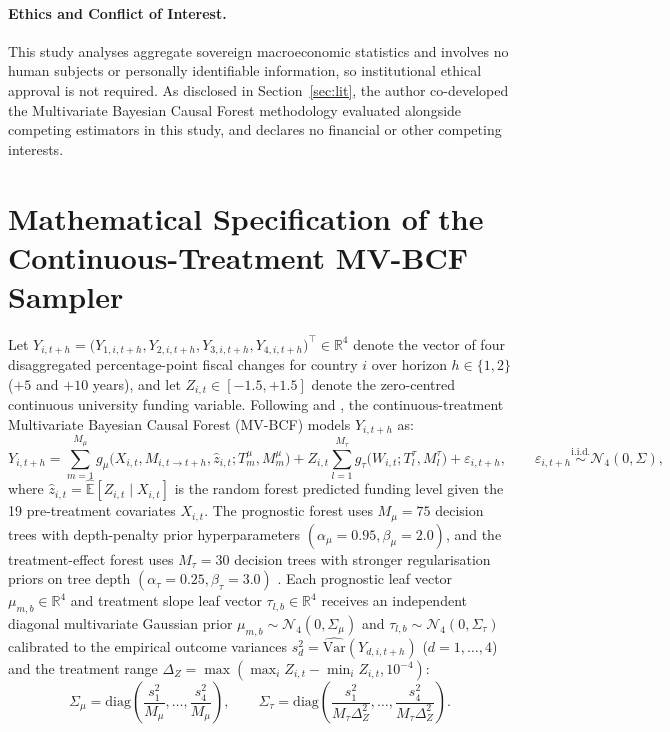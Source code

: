 \documentclass[11pt,a4paper]{article}
\begin{document}
\paragraph{Ethics and Conflict of Interest.}
This study analyses aggregate sovereign macroeconomic statistics and involves no human subjects or personally identifiable information, so institutional ethical approval is not required. As disclosed in Section~\ref{sec:lit}, the author co-developed the Multivariate Bayesian Causal Forest methodology \citep{mcjames2024mvbcf} evaluated alongside competing estimators in this study, and declares no financial or other competing interests.

\appendix

\section{Mathematical Specification of the Continuous-Treatment MV-BCF Sampler}
\label{app:math}

Let $Y_{i, t+h} = \bigl(Y_{1,i,t+h}, Y_{2,i,t+h}, Y_{3,i,t+h}, Y_{4,i,t+h}\bigr)^\top \in \mathbb{R}^4$ denote the vector of four disaggregated percentage-point fiscal changes for country $i$ over horizon $h \in \{1, 2\}$ ($+5$ and $+10$ years), and let $Z_{i,t} \in [-1.5, +1.5]$ denote the zero-centred continuous university funding variable. Following \citet{hahn2020bayesian} and \citet{mcjames2024mvbcf}, the continuous-treatment Multivariate Bayesian Causal Forest (MV-BCF) models $Y_{i, t+h}$ as:
\begin{equation}
  Y_{i, t+h} = \sum_{m=1}^{M_\mu} g_\mu\bigl(X_{i,t}, M_{i,t\to t+h}, \hat{z}_{i,t}; T^\mu_m, M^\mu_m\bigr) + Z_{i,t} \sum_{l=1}^{M_\tau} g_\tau\bigl(W_{i,t}; T^\tau_l, M^\tau_l\bigr) + \varepsilon_{i, t+h}, \qquad \varepsilon_{i, t+h} \stackrel{\text{i.i.d.}}{\sim} \mathcal{N}_4(0, \Sigma),
\end{equation}
where $\hat{z}_{i,t} = \hat{\mathbb{E}}[Z_{i,t} \mid X_{i,t}]$ is the random forest predicted funding level given the 19 pre-treatment covariates $X_{i,t}$. The prognostic forest uses $M_\mu = 75$ decision trees with depth-penalty prior hyperparameters $(\alpha_\mu = 0.95, \beta_\mu = 2.0)$, and the treatment-effect forest uses $M_\tau = 30$ decision trees with stronger regularisation priors on tree depth $(\alpha_\tau = 0.25, \beta_\tau = 3.0)$ \citep{hahn2020bayesian}. Each prognostic leaf vector $\mu_{m,b} \in \mathbb{R}^4$ and treatment slope leaf vector $\tau_{l,b} \in \mathbb{R}^4$ receives an independent diagonal multivariate Gaussian prior $\mu_{m,b} \sim \mathcal{N}_4(0, \Sigma_{\mu})$ and $\tau_{l,b} \sim \mathcal{N}_4(0, \Sigma_{\tau})$ calibrated to the empirical outcome variances $s_d^2 = \widehat{\text{Var}}(Y_{d,i,t+h})$ ($d=1,\dots,4$) and the treatment range $\Delta_Z = \max(\max_i Z_{i,t} - \min_i Z_{i,t}, 10^{-4})$:
\begin{equation}
  \Sigma_{\mu} = \text{diag}\!\left(\frac{s_1^2}{M_\mu}, \dots, \frac{s_4^2}{M_\mu}\right), \qquad \Sigma_{\tau} = \text{diag}\!\left(\frac{s_1^2}{M_\tau \Delta_Z^2}, \dots, \frac{s_4^2}{M_\tau \Delta_Z^2}\right).
\end{equation}
\end{document}
